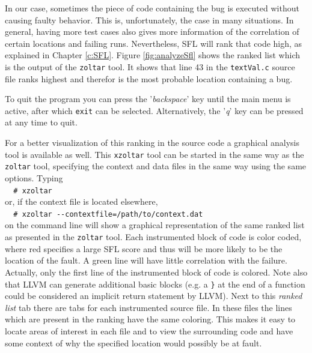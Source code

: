 	In our case, sometimes the piece of code containing the bug is executed without causing
	faulty behavior.
	This is, unfortunately, the case in many situations.
	In general, having more test cases also gives more information of the correlation of certain locations and
	failing runs.
	Nevertheless, SFL will rank that code high, as explained in Chapter \ref{c:SFL}.
	Figure \ref{fig:analyzeSfl} shows the ranked list which is the output of the \verb|zoltar| tool.
	It shows that line 43 in the \verb|textVal.c| source file ranks highest 
	and therefor is the most probable location containing a bug.
	
	To quit the program you can press the '\emph{backspace}' key until the main menu is active,
	after which \verb|exit| can be selected.
	Alternatively, the '\emph{q}' key can be pressed at any time to quit.
	
	For a better visualization of this ranking in the source code
	a graphical analysis tool is available as well.
	This \verb|xzoltar| tool can be started in the same way as the \verb|zoltar| tool,
	specifying the context and data files in the same way using the same options.
	Typing \\
	\verb|  # xzoltar|\\
	or, if the context file is located elsewhere,\\
	\verb|  # xzoltar --contextfile=/path/to/context.dat|\\
	on the command line will show a graphical representation of the same ranked list as
	presented in the \verb|zoltar| tool.
	Each instrumented block of code is color coded, 
	where red specifies a large SFL score and thus will be more
	likely to be the location of the fault.
	A green line will have little correlation with the failure.
	Actually, only the first line of the instrumented block of code is colored.
	Note also that LLVM can generate additional basic blocks
	(e.g. a \verb|}| at the end of a function could be considered an
	implicit return statement by LLVM).
	Next to this \emph{ranked list} tab there are tabs for each instrumented source file.
	In these files the lines which are present in the ranking have the same coloring.
	This makes it easy to locate areas of interest in each file and to 
	view the surrounding code and have some context of why the specified location would
	possibly be at fault.
	
